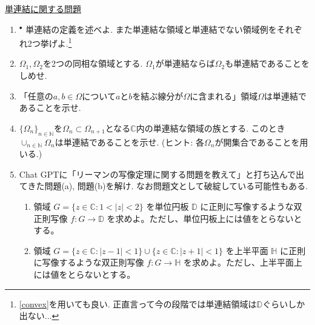 \documentclass[dvipdfmx,a4paper,11pt]{article}
\newcommand{\N}{\mathbb{N}}
\newcommand{\C}{\mathbb{C}}
\newcommand{\D}{\mathbb{D}}
\theoremstyle{definition}
\begin{document}
\vspace{12pt}
\hspace{-24pt}\underline{単連結に関する問題}
\begin{enumerate}[label=\textbf{問}8.\arabic*]

\item $^{\bullet}$ 単連結の定義を述べよ. また単連結な領域と単連結でない領域例をそれぞれ2つ挙げよ.\footnote{\ref{convex}を用いても良い. 正直言って今の段階では単連結領域は$\D$ぐらいしか出ない...}

\item $\Omega_{1}, \Omega_{2}$を2つの同相な領域とする. $\Omega_{1}$が単連結ならば$\Omega_2$も単連結であることをしめせ.

\item \label{convex} 「任意の$a, b \in \Omega$について$a$と$b$を結ぶ線分が$\Omega$に含まれる」領域$\Omega$は単連結であることを示せ. 

\item $\{ \Omega_{n} \}_{n \in \N}$を$\Omega_n \subset \Omega_{n+1}$となる$\C$内の単連結な領域の族とする. このとき$\cup_{n \in \N}\Omega_{n}$は単連結であることを示せ. (ヒント: 各$\Omega_n$が開集合であることを用いる.)

    
    \item Chat GPTに「リーマンの写像定理に関する問題を教えて」と打ち込んで出てきた問題(a), 問題(b)を解け. なお問題文として破綻している可能性もある.
    \vspace{-8pt}
       \begin{enumerate}
\setlength{\parskip}{0cm} 
  \setlength{\itemsep}{0cm} 
  \item 領域 $G=\{z\in \mathbb{C}: 1<|z|<2\}$ を単位円板 $\mathbb{D}$ に正則に写像するような双正則写像 $f:G\to \mathbb{D}$ を求めよ。ただし、単位円板上には値をとらないとする。
  \item 領域 $G=\{z\in \mathbb{C}: |z-1|<1\}\cup \{z\in \mathbb{C}: |z+1|<1\}$ を上半平面 $\mathbb{H}$ に正則に写像するような双正則写像 $f:G\to \mathbb{H}$ を求めよ。ただし、上半平面上には値をとらないとする。
      \end{enumerate} 

  
  
  



\end{enumerate}
\end{document}
